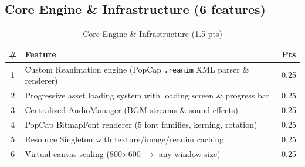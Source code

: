 \documentclass[12pt,a4paper]{article}
\begin{document}
\subsection{Core Engine \& Infrastructure (6 features)}
\renewcommand{\arraystretch}{1.2}
\begin{table}[htbp]
\centering
\footnotesize
\begin{tabular}{clc}
\toprule
\textbf{\#} & \textbf{Feature} & \textbf{Pts} \\
\midrule
1  & Custom Reanimation engine (PopCap \texttt{.reanim} XML parser \& renderer) & 0.25 \\
2  & Progressive asset loading system with loading screen \& progress bar & 0.25 \\
3  & Centralized AudioManager (BGM streams \& sound effects) & 0.25 \\
4  & PopCap BitmapFont renderer (5 font families, kerning, rotation) & 0.25 \\
5  & Resource Singleton with texture/image/reanim caching & 0.25 \\
6  & Virtual canvas scaling (800$\times$600 $\to$ any window size) & 0.25 \\
\bottomrule
\end{tabular}
\caption{Core Engine \& Infrastructure (1.5 pts)}
\end{table}
\end{document}
